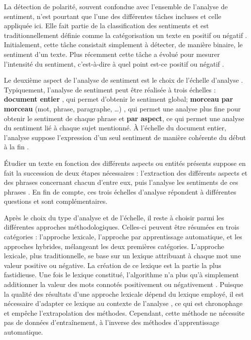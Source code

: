 \documentclass[a4paper,12pt, openany]{book}
\begin{document}
La détection de polarité, souvent confondue avec l'ensemble de l'analyse de sentiment, n'est pourtant que l'une des différentes tâches incluses \parencite{cambria17} et celle appliquée ici. Elle fait partie de la classification des sentiments et est traditionnellement définie comme la catégorisation un texte en positif ou négatif \parencite{wang14}. Initialement, cette tâche consistait simplement à détecter, de manière binaire, le sentiment d'un texte. Plus récemment cette tâche a évolué pour mesurer l'intensité du sentiment, c'est-à-dire à quel point est-ce positif ou négatif \parencite{cambria17}. \par 

Le deuxième aspect de l'analyse de sentiment est le choix de l'échelle d'analyse \parencite{liu12}. Typiquement, l'analyse de sentiment peut être réalisée à trois échelles : \textbf{document entier} \parencites{li13, li10, rui13, zhan09}, qui permet d'obtenir le sentiment global; \textbf{morceau par morceau} (mot, phrase, paragraphe, …) \parencites{nguyen18, wilson05, narayanan09, liujun13, yu13}, qui permet une analyse plus fine pour obtenir le sentiment de chaque phrase et \textbf{par aspect}, ce qui permet une analyse du sentiment lié à chaque sujet mentionné. À l'échelle du document entier, l'analyse suppose l'expression d'un seul sentiment de manière cohérente du début à la fin \parencites{pang02, hu11}. \par

Étudier un texte en fonction des différents aspects ou entités présents suppose en fait la succession de deux étapes nécessaires : l'extraction des différents aspects et des phrases concernant chacun d'entre eux, puis l'analyse les sentiments de ces phrases \parencite{liuzhang12}. En fin de compte, ces trois échelles d'analyse répondent à différentes questions et sont complémentaires. \par


Après le choix du type d'analyse et de l'échelle, il reste à choisir parmi les différentes approches méthodologiques. Celles-ci peuvent être résumées en trois catégories : l'approche lexicale, l'approche par apprentissage automatique, et les approches hybrides, mélangeant les deux premières catégories. L'approche lexicale, plus traditionnelle, se base sur un lexique attribuant à chaque mot une valeur positive ou négative. La création de ce lexique est la partie la plus fastidieuse. Une fois le lexique constitué, l'algorithme n'a plus qu'à simplement additionner la valeur des mots connotés positivement ou négativement \parencite{hemmatian19}. Puisque la qualité des résultats d'une approche lexicale dépend du lexique employé, il est nécessaire d'adapter ce lexique au contexte de l'analyse \parencite{ligthart21}, ce qui est chronophage et empêche l'extrapolation des méthodes. Cependant, cette méthode ne nécessite pas de données d'entraînement, à l'inverse des méthodes d'apprentissage automatique. \par
\end{document}
